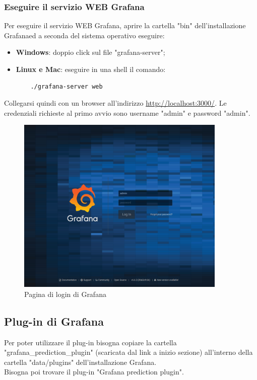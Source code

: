 \subsubsection{Eseguire il servizio WEB Grafana} Per eseguire il servizio WEB Grafana\glo, aprire la cartella "bin" dell'installazione Grafana\glosp ed a seconda del sistema operativo eseguire:
\begin{itemize}
	\item \textbf{Windows}: doppio click sul file "grafana-server";
	\item \textbf{Linux e Mac}: eseguire in una shell il comando:
	\begin{verbatim}
	./grafana-server web
	\end{verbatim}
\end{itemize}
Collegarsi quindi con un browser all'indirizzo \url{http://localhost:3000/}. Le credenziali richieste al primo avvio sono username "admin" e password "admin".
\begin{figure}[H] 	
	\begin{center}
		\includegraphics[width=10cm,height=\textheight,keepaspectratio]{img/grafana-login.png}
	\end{center}
	\caption{Pagina di login di Grafana}	
\end{figure}

\subsection{Plug-in di Grafana}
Per poter utilizzare il plug-in bisogna copiare la cartella "grafana\_prediction\_plugin" (scaricata dal link a inizio sezione) all'interno della cartella "data/plugins" dell'installazione Grafana\glo. \\
Bisogna poi trovare il plug-in "Grafana prediction plugin".

